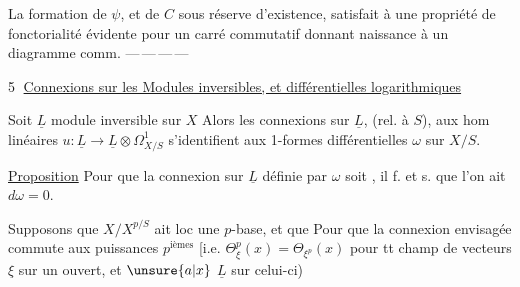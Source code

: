 La formation de $\psi$, et de $C$ sous réserve d'existence, satisfait à une propriété de fonctorialité évidente pour un carré commutatif
donnant naissance à un diagramme comm.
\noindent ---\,---\,---\,---

\textcircled{5}  \uline{Connexions sur les Modules inversibles, et différentielles logarithmiques}

Soit $\underline L$ module inversible sur $X$   Alors les connexions \inserted{$\Delta$} sur $\underline L$,  (rel. à $S$),  aux hom linéaires $u:\underline L\longrightarrow\underline L\otimes\Omega^1_{X/S}$  s'identifient aux 1-formes différentielles  $\omega$ sur $X/S$.

\uline{Proposition}\quad {} Pour que la connexion sur $\underline L$ définie par $\omega$ soit , il f. et s. que l'on ait $d\omega=0$.

 Supposons que $X/X^{p/S}$ ait loc une $p$-base, et que  Pour que la connexion envisagée commute aux puissances $p^{\text{ièmes}}$ [i.e. $\Theta_\xi^p(x)=\Theta_{\xi^p}(x)$ pour tt champ de vecteurs $\xi$ sur un ouvert, et  $\unsure{a|x}$  $\underline L$ sur celui-ci)

